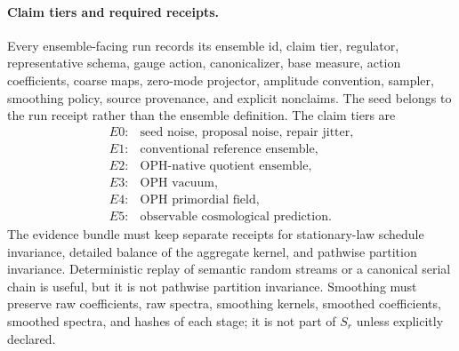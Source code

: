 \paragraph{Claim tiers and required receipts.}
Every ensemble-facing run records its ensemble id, claim tier, regulator, representative
schema, gauge action, canonicalizer, base measure, action coefficients, coarse maps,
zero-mode projector, amplitude convention, sampler, smoothing policy, source provenance, and
explicit nonclaims. The seed belongs to the run receipt rather than the ensemble definition. The
claim tiers are
\[
\begin{array}{ll}
E0:&\text{seed noise, proposal noise, repair jitter},\\
E1:&\text{conventional reference ensemble},\\
E2:&\text{OPH-native quotient ensemble},\\
E3:&\text{OPH vacuum},\\
E4:&\text{OPH primordial field},\\
E5:&\text{observable cosmological prediction}.
\end{array}
\]
The evidence bundle must keep separate receipts for stationary-law schedule invariance, detailed balance
of the aggregate kernel, and pathwise partition invariance.  Deterministic replay of semantic
random streams or a canonical serial chain is useful, but it is not pathwise partition invariance.
Smoothing must preserve raw coefficients, raw spectra, smoothing kernels, smoothed coefficients,
smoothed spectra, and hashes of each stage; it is not part of \(S_r\) unless explicitly declared.
